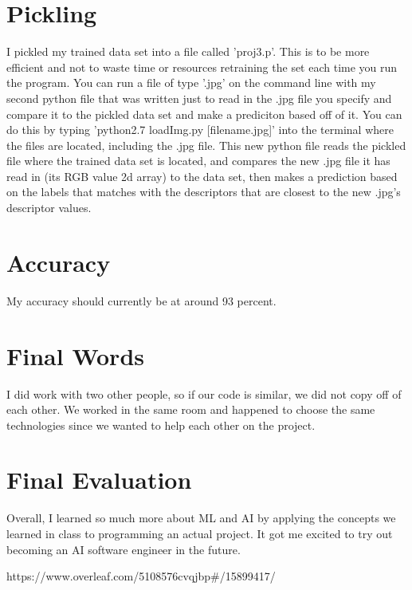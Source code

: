 \documentclass[a4paper, 11pt]{article}
\begin{document}
\section*{Pickling}
I pickled my trained data set into a file called 'proj3.p'. This is to be more efficient and not to waste time or resources retraining the set each time you run the program. You can run a file of type '.jpg' on the command line with my second python file that was written just to read in the .jpg file you specify and compare it to the pickled data set and make a prediciton based off of it. You can do this by typing 'python2.7 loadImg.py [filename.jpg]' into the terminal where the files are located, including the .jpg file. This new python file reads the pickled file where the trained data set is located, and compares the new .jpg file it has read in (its RGB value 2d array) to the data set, then makes a prediction based on the labels that matches with the descriptors that are closest to the new .jpg's descriptor values.

\section*{Accuracy}
My accuracy should currently be at around 93 percent.

\section*{Final Words}
I did work with two other people, so if our code is similar, we did not copy off of each other. We worked in the same room and happened to choose the same technologies since we wanted to help each other on the project.

\section*{Final Evaluation}
Overall, I learned so much more about ML and AI by applying the concepts we learned in class to programming an actual project. It got me excited to try out becoming an AI software engineer in the future.

\begin{thebibliography}{9}
https://www.overleaf.com/5108576cvqjbp#/15899417/
\end{thebibliography}
\end{document}
